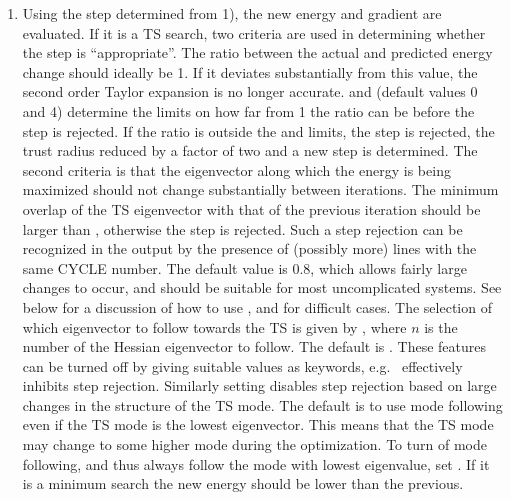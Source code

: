 \begin{enumerate}
\item Using the step determined from 1), the new energy and gradient are 
evaluated. If it is a TS search, two criteria are used in determining whether 
the step is ``appropriate''. The ratio between the actual and predicted energy 
change should ideally be 1. If it deviates substantially from this value, the 
second order Taylor expansion is no longer accurate.  and 
(default  values 0 and 4) determine the limits on how far from 1 the ratio can
be before the step is rejected. If the ratio is outside the  and
 limits, the  step is rejected, the trust   radius reduced by a
factor of two and a new step  is determined. The second criteria is that the
eigenvector along which the  energy is being maximized should not change
substantially between iterations.  The minimum overlap of the TS eigenvector
with that of the previous iteration  should be larger than ,
otherwise the step is rejected. Such a step  rejection can be recognized in the
output by the presence of (possibly more)  lines with the   same CYCLE number.
The default  value is 0.8, which allows  fairly large changes to
occur, and should be suitable for most uncomplicated  systems. See below for a
discussion of how to use ,  and  for 
difficult cases. The selection of which eigenvector to follow towards the TS
is  given by , where $n$ is the number of the Hessian
eigenvector to follow.  The default is . These features can be
turned off by giving suitable  values as keywords, e.g.\  effectively inhibits step  rejection. Similarly setting 
disables step rejection based on large  changes in the structure of the TS
mode. The default is to use mode following  even if the TS mode is the lowest
eigenvector. This means that the TS mode may  change to   some higher mode
during the optimization. To turn of mode  following, and thus always follow the
mode with lowest eigenvalue, set . If  it is a minimum search the
new energy should be lower than the previous. 


\end{enumerate}

